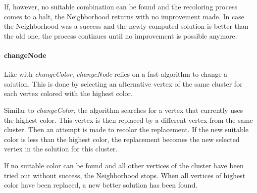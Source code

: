 \documentclass[paper=a4,fontsize=12pt]{scrartcl}
\begin{document}
If, however, no suitable combination can be found and the recoloring process comes to a halt, the Neighborhood returns with no improvement made. In case the Neighborhood was a success and the newly computed solution is better than the old one, the process continues until no improvement is possible anymore.



\paragraph{changeNode}
Like with \emph{changeColor}, \emph{changeNode} relies on a fast algorithm to change a solution. This is done by selecting an alternative vertex of the same cluster for each vertex colored with the highest color.


Similar to \emph{changeColor}, the algorithm searches for a vertex that currently uses the highest color. This vertex is then replaced by a different vertex from the same cluster. Then an attempt is made to recolor the replacement. If the new suitable color is less than the highest color, the replacement becomes the new selected vertex in the solution for this cluster. 


If no suitable color can be found and all other vertices of the cluster have been tried out without success, the Neighborhood stops. When all vertices of highest color have been replaced, a new better solution has been found.
\end{document}

